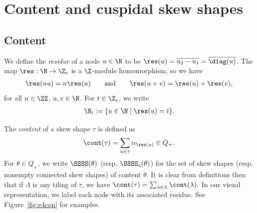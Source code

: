 \section{Content and cuspidal skew shapes}

\subsection{Content}\label{contentsec}
We define the {\em residue} of a node \(u \in \N\) to be 
\(\res(u) =\overline{u_2 - u_1} = \overline{\diag(u)}\).
The map \(\res: \N \to \Z_e\) is a \(\Z\)-module homomorphism, so we have
\begin{align*}
\res(n u) = n \res(u)
\qquad
\textup{and}
\qquad
\res(u+v) = \res(u) + \res(v),
\end{align*}
for all \(n \in \ZZ\), \(u,v \in \N\). For \(t \in \Z_e\), we write
\begin{align*}
\N_t := \{ u \in \N \mid \res(u) = t\}.
\end{align*}



The {\em content} of a skew shape \(\tau\) is defined as
\begin{align*}
\cont(\tau) = \sum_{u \in \tau} \alpha_{\res(u)} \in Q_+.
\end{align*}
For \(\theta \in Q_+\), we write \(\SSSS(\theta)\) (resp. \(\SSSS_{\tt c}(\theta)\)) for the set of skew shapes (resp. nonempty connected skew shapes) of content \(\theta\). It is clear from definitions then that if \(\Lambda\) is any tiling of \(\tau\), we have
\(
\cont(\tau) = \sum_{\lambda \in \Lambda} \cont(\lambda).
\)
In our visual representation, we label each node with its associated residue. See Figure~\ref{fig:e4con} for examples.

